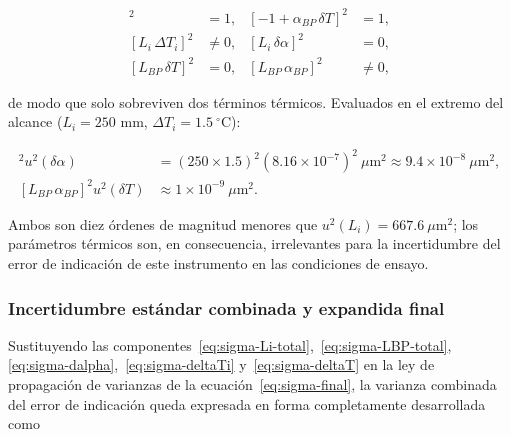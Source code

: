 \begin{align*}
    [1 + \delta\alpha\,\Delta T_i]^2 &= 1, &
    [-1 + \alpha_{BP}\,\delta T]^2 &= 1, \\
    [L_i\,\Delta T_i]^2 &\neq 0, &
    [L_i\,\delta\alpha]^2 &= 0, \\
    [L_{BP}\,\delta T]^2 &= 0, &
    [L_{BP}\,\alpha_{BP}]^2 &\neq 0,
\end{align*}

de modo que solo sobreviven dos términos térmicos. Evaluados en el extremo del
alcance ($L_i = 250$ mm, $\Delta T_i = 1.5\ ^\circ\text{C}$):

\begin{align}
    [L_i\,\Delta T_i]^2 u^2(\delta\alpha)
    &= (250 \times 1.5)^2 \left(8.16\times10^{-7}\right)^2\ \mu\text{m}^2
    \approx 9.4\times10^{-8}\ \mu\text{m}^2,
    \label{eq:termino-termico} \\
    [L_{BP}\,\alpha_{BP}]^2 u^2(\delta T)
    &\approx 1\times10^{-9}\ \mu\text{m}^2 .
    \label{eq:termino-termico-2}
\end{align}

Ambos son diez órdenes de magnitud menores que
$u^2(L_i) = 667.6\ \mu\text{m}^2$; los parámetros térmicos son, en consecuencia,
irrelevantes para la incertidumbre del error de indicación de este instrumento en las
condiciones de ensayo.

\subsubsection{Incertidumbre estándar combinada y expandida final}

Sustituyendo las componentes~\eqref{eq:sigma-Li-total},~\eqref{eq:sigma-LBP-total},
\eqref{eq:sigma-dalpha},~\eqref{eq:sigma-deltaTi} y~\eqref{eq:sigma-deltaT} en la ley
de propagación de varianzas de la ecuación~\eqref{eq:sigma-final}, la varianza
combinada del error de indicación queda expresada en forma completamente desarrollada
como

